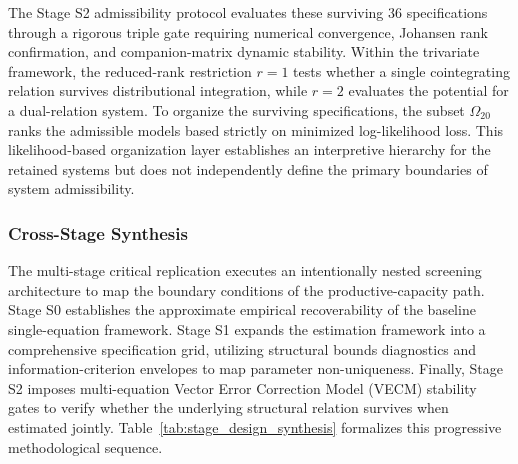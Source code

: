 \documentclass[11pt]{article}
\begin{document}
The Stage S2 admissibility protocol evaluates these surviving 36 specifications through a rigorous triple gate requiring numerical convergence, Johansen rank confirmation, and companion-matrix dynamic stability. Within the trivariate framework, the reduced-rank restriction $r=1$ tests whether a single cointegrating relation survives distributional integration, while $r=2$ evaluates the potential for a dual-relation system. To organize the surviving specifications, the subset $\Omega_{20}$ ranks the admissible models based strictly on minimized log-likelihood loss. This likelihood-based organization layer establishes an interpretive hierarchy for the retained systems but does not independently define the primary boundaries of system admissibility.

\subsubsection{Cross-Stage Synthesis}
\label{subsec:stage_design_synthesis}

The multi-stage critical replication executes an intentionally nested screening architecture to map the boundary conditions of the productive-capacity path. Stage S0 establishes the approximate empirical recoverability of the baseline single-equation framework. Stage S1 expands the estimation framework into a comprehensive specification grid, utilizing structural bounds diagnostics and information-criterion envelopes to map parameter non-uniqueness. Finally, Stage S2 imposes multi-equation Vector Error Correction Model (VECM) stability gates to verify whether the underlying structural relation survives when estimated jointly. Table~\ref{tab:stage_design_synthesis} formalizes this progressive methodological sequence.
\end{document}
